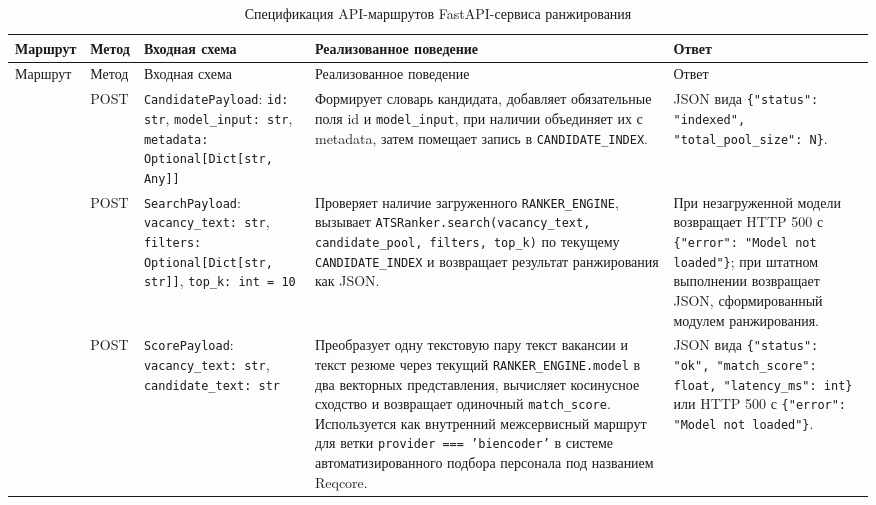 \begin{small}
\begin{longtable}{|P{0.17\textwidth}|P{0.06\textwidth}|P{0.20\textwidth}|P{0.27\textwidth}|P{0.20\textwidth}|}
\caption{Спецификация API-маршрутов FastAPI-сервиса ранжирования}\label{tbl:api}\\
\hline
Маршрут & Метод & Входная схема & Реализованное поведение & Ответ \\
\hline
\endfirsthead
\hline
Маршрут & Метод & Входная схема & Реализованное поведение & Ответ \\
\hline
\endhead
\hline
\endfoot
\hline
\endlastfoot
{} & POST & \texttt{CandidatePayload}: \texttt{id: str}, \texttt{model\_input: str}, \texttt{metadata: Optional{[}Dict{[}str, Any{]}{]}} & Формирует словарь кандидата, добавляет обязательные поля id и \texttt{model\_input}, при наличии объединяет их с metadata, затем помещает запись в \texttt{CANDIDATE\_INDEX}. & JSON вида \texttt{\{"status": "indexed", "total\_pool\_size": N\}}. \\
\hline
{} & POST & \texttt{SearchPayload}: \texttt{vacancy\_text: str}, \texttt{filters: Optional{[}Dict{[}str, str{]}{]}}, \texttt{top\_k: int = 10} & Проверяет наличие загруженного \texttt{RANKER\_ENGINE}, вызывает \texttt{ATSRanker.search(vacancy\_text, candidate\_pool, filters, top\_k)} по текущему \texttt{CANDIDATE\_INDEX} и возвращает результат ранжирования как JSON. & При незагруженной модели возвращает HTTP 500 с \texttt{\{"error": "Model not loaded"\}}; при штатном выполнении возвращает JSON, сформированный модулем ранжирования. \\
\hline
{} & POST & \texttt{ScorePayload}: \texttt{vacancy\_text: str}, \texttt{candidate\_text: str} & Преобразует одну текстовую пару текст вакансии и текст резюме через текущий \texttt{RANKER\_ENGINE.model} в два векторных представления, вычисляет косинусное сходство и возвращает одиночный \texttt{match\_score}. Используется как внутренний межсервисный маршрут для ветки \texttt{provider === 'biencoder'} в системе автоматизированного подбора персонала под названием Reqcore. & JSON вида \texttt{\{"status": "ok", "match\_score": float, "latency\_ms": int\}} или HTTP 500 с \texttt{\{"error": "Model not loaded"\}}. \\
\end{longtable}
\end{small}

